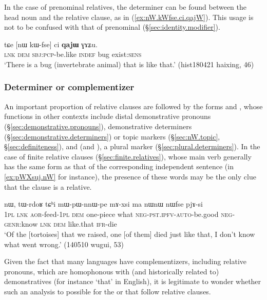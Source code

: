 In the case of prenominal relatives, the determiner  can be found between the head noun and the relative clause, as in (\ref{ex:nW.kWfse.ci.qajW}). This usage is not to be confused with that of prenominal  (§\ref{sec:identity.modifier}).

\begin{exe}
\ex \label{ex:nW.kWfse.ci.qajW}
\gll tɕe [nɯ kɯ-fse] ci \textbf{qajɯ} ɣɤʑu. \\
\textsc{lnk} \textsc{dem} \textsc{sbj}:\textsc{pcp}-be.like \textsc{indef} bug exist:\textsc{sens} \\
\glt  `There is a bug (invertebrate animal) that is like that.' (hist180421 haixing, 46)
\end{exe} 

\subsubsection{Determiner or complementizer} \label{sec:relative.determiners.complementizer}
An important proportion of relative clauses are followed by the forms  and , whose functions in other contexts include distal demonstrative pronouns (§\ref{sec:demonstrative.pronouns}), demonstrative determiners (§\ref{sec:demonstrative.determiners}) or topic markers (§\ref{sec:nW.topic}, §\ref{sec:definiteness}), and  (and ), a plural marker (§\ref{sec:plural.determiners}). In the case of finite relative clauses (§\ref{sec:finite.relatives}), whose main verb generally has the same form as that of the corresponding independent sentence (in \ref{ex:pWXsuj.nW} for instance), the presence of these words may be the only clue that the clause is a relative.

\begin{exe}
\ex \label{ex:pWXsuj.nW}
 nɯ, tɯ-rdoʁ tɕʰi mɯ-pɯ-nnɯ-pe mɤ-xsi ma nɯnɯ nɯfse pjɤ-si \\
\textsc{1pl} \textsc{lnk} \textsc{aor}-feed-\textsc{1pl} \textsc{dem} one-piece what \textsc{neg}-\textsc{pst}.\textsc{ipfv}-\textsc{auto}-be.good \textsc{neg}-\textsc{genr}:know \textsc{lnk} \textsc{dem} like.that \textsc{ifr}-die \\
\glt `Of the [tortoises] that we raised, one [of them] died just like that, I don't know what went wrong.' (140510 wugui, 53)
\end{exe}  

Given the fact that many languages have complementizers, including relative pronouns, which are homophonous with (and historically related to) demonstratives (for instance `that' in English), it is legitimate to wonder whether such an analysis to possible for the  or  that follow relative clauses.

